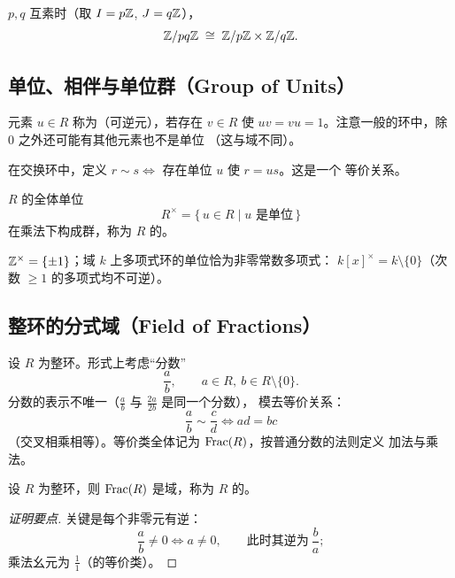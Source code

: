 \begin{remark}[整数版本]
$p, q$ 互素时（取 $I = p\mathbb{Z}$, $J = q\mathbb{Z}$），
\[
  \mathbb{Z}/pq\mathbb{Z} \;\cong\; \mathbb{Z}/p\mathbb{Z}\times\mathbb{Z}/q\mathbb{Z}.
\]
\end{remark}

\subsection{单位、相伴与单位群（Group of Units）}

\begin{definition}[单位]
元素 $u\in R$ 称为（可逆元），若存在 $v\in R$ 使
$uv = vu = 1$。注意一般的环中，除 $0$ 之外还可能有其他元素也不是单位
（这与域不同）。
\end{definition}

\begin{definition}[相伴关系]
在交换环中，定义 $r\sim s \iff$ 存在单位 $u$ 使 $r = us$。这是一个
等价关系。
\end{definition}

\begin{definition}
$R$ 的全体单位
\[
  R^\times = \{\,u\in R \mid u\text{ 是单位}\,\}
\]
在乘法下构成群，称为 $R$ 的。
\end{definition}

\begin{example}
$\mathbb{Z}^\times = \{\pm 1\}$；域 $k$ 上多项式环的单位恰为非零常数多项式：
$k[x]^\times = k\setminus\{0\}$（次数 $\ge 1$ 的多项式均不可逆）。
\end{example}

\subsection{整环的分式域（Field of Fractions）}

设 $R$ 为整环。形式上考虑“分数”
\[
  \frac{a}{b}, \qquad a\in R,\ b\in R\setminus\{0\}.
\]
分数的表示不唯一（$\frac{a}{b}$ 与 $\frac{2a}{2b}$ 是同一个分数），
模去等价关系：
\[
  \frac{a}{b}\sim\frac{c}{d} \iff ad = bc
\]
（交叉相乘相等）。等价类全体记为 $\mathrm{Frac}(R)$，按普通分数的法则定义
加法与乘法。

\begin{theorem}[分式域]
设 $R$ 为整环，则 $\mathrm{Frac}(R)$ 是域，称为 $R$ 的。
\end{theorem}

\begin{proof}[证明要点]
关键是每个非零元有逆：
\[
  \frac{a}{b}\ne 0 \iff a\ne 0,\qquad
  \text{此时其逆为}\ \frac{b}{a};
\]
乘法幺元为 $\frac{1}{1}$（的等价类）。
\end{proof}

